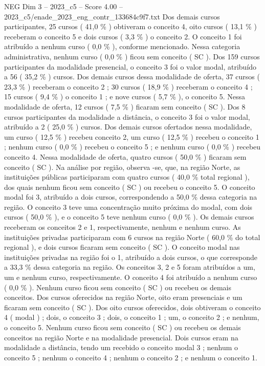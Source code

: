 \begin{textsample}{NEG Dim 3 – 2023\_c5 – Score 4.00 – 2023\_c5/enade\_2023\_eng\_contr\_133684c9f7.txt}
Dos demais cursos participantes, 25 cursos ( 41,0 \% ) obtiveram o conceito 4, oito cursos ( 13,1 \% ) receberam o conceito 5 e dois cursos ( 3,3 \% ) o conceito 2.
O conceito 1 foi atribuído a nenhum curso ( 0,0 \% ), conforme mencionado.
Nessa categoria administrativa, nenhum curso ( 0,0 \% ) ficou sem conceito ( SC ).
Dos 159 cursos participantes da modalidade presencial, o conceito 3 foi o valor modal, atribuído a 56 ( 35,2 \% ) cursos.
Dos demais cursos dessa modalidade de oferta, 37 cursos ( 23,3 \% ) receberam o conceito 2 ; 30 cursos ( 18,9 \% ) receberam o conceito 4 ; 15 cursos ( 9,4 \% ) o conceito 1 ; e nove cursos ( 5,7 \% ), o conceito 5.
Nessa modalidade de oferta, 12 cursos ( 7,5 \% ) ficaram sem conceito ( SC ).
Dos 8 cursos participantes da modalidade a distância, o conceito 3 foi o valor modal, atribuído a 2 ( 25,0 \% ) cursos.
Dos demais cursos ofertados nessa modalidade, um curso ( 12,5 \% ) recebeu conceito 2, um curso ( 12,5 \% ) recebeu o conceito 1 ; nenhum curso ( 0,0 \% ) recebeu o conceito 5 ; e nenhum curso ( 0,0 \% ) recebeu conceito 4.
Nessa modalidade de oferta, quatro cursos ( 50,0 \% ) ficaram sem conceito ( SC ).
Na análise por região, observa -se, que, na região Norte, as instituições públicas participaram com quatro cursos ( 40,0 \% total regional ), dos quais nenhum ficou sem conceito ( SC ) ou recebeu o conceito 5.
O conceito modal foi 3, atribuído a dois cursos, correspondendo a 50,0 \% dessa categoria na região.
O conceito 3 teve uma concentração muito próxima do modal, com dois cursos ( 50,0 \% ), e o conceito 5 teve nenhum curso ( 0,0 \% ).
Os demais cursos receberam os conceitos 2 e 1, respectivamente, nenhum e nenhum curso.
As instituições privadas participaram com 6 cursos na região Norte ( 60,0 \% do total regional ), e dois cursos ficaram sem conceito ( SC ).
O conceito modal nas instituições privadas na região foi o 1, atribuído a dois cursos, o que corresponde a 33,3 \% dessa categoria na região.
Os conceitos 3, 2 e 5 foram atribuídos a um, um e nenhum curso, respectivamente.
O conceito 4 foi atribuído a nenhum curso ( 0,0 \% ).
Nenhum curso ficou sem conceito ( SC ) ou recebeu os demais conceitos.
Dos cursos oferecidos na região Norte, oito eram presenciais e um ficaram sem conceito ( SC ).
Dos oito cursos oferecidos, dois obtiveram o conceito 4 ( modal ) ; dois, o conceito 3 ; dois, o conceito 1 ; um, o conceito 2 ; e nenhum, o conceito 5.
Nenhum curso ficou sem conceito ( SC ) ou recebeu os demais conceitos na região Norte e na modalidade presencial.
Dois cursos eram na modalidade a distância, tendo um recebido o conceito modal 3 ; nenhum o conceito 5 ; nenhum o conceito 4 ; nenhum o conceito 2 ; e nenhum o conceito 1.

\end{textsample}
